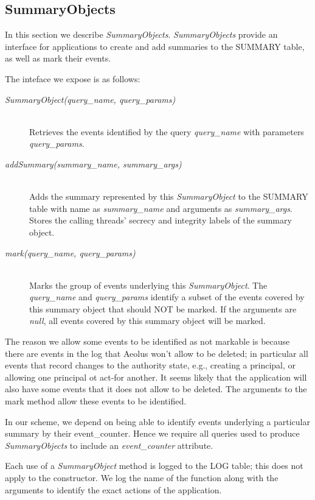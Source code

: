 \subsection{SummaryObjects}
\label{model:summary-objects}

In this section we describe \emph{SummaryObjects}. \emph{SummaryObjects} provide an interface for applications to create and add summaries to the SUMMARY table, as well as mark their events.

The inteface we expose is as follows:
\begin{description}
  \item[\emph{SummaryObject(query\_name, query\_params)}] \ \\
    Retrieves the events identified by the query
    \emph{query\_name} with parameters \emph{query\_params}.
  \item[\emph{addSummary(summary\_name, summary\_args)}] \ \\
    Adds the summary represented by this 
    \emph{SummaryObject} to the SUMMARY table with
    name as \emph{summary\_name} and arguments
    as \emph{summary\_args}.
    Stores the calling threads' secrecy and integrity
    labels of the summary object.
  \item[\emph{mark(query\_name, query\_params)}] \ \\
    Marks the group of events underlying this
    \emph{SummaryObject}. The \emph{query\_name}
    and \emph{query\_params} identify a subset
    of the events covered by this summary object
    that should NOT be marked.
    If the arguments are \emph{null}, all events
    covered by this summary object will be marked.
\end{description}

\noindent
The reason we allow some events to be identified as not markable is because there are events in the log that Aeolus won't allow to be deleted; in particular all events that record changes to the authority state, e.g., creating a principal, or allowing one principal ot act-for another. It seems likely that the application will also have some events that it does not allow to be deleted. The arguments to the mark method allow these events to be identified.

In our scheme, we depend on being able to identify events underlying a particular summary by their event\_counter. Hence we require all queries used to produce \emph{SummaryObjects} to include an \emph{event\_counter} attribute.

Each use of a \emph{SummaryObject} method is logged to the LOG table; this does not apply to the constructor. We log the name of the function along with the arguments to identify the exact actions of the application.

